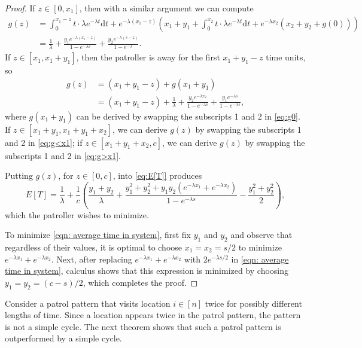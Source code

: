 \documentclass[11pt,a4paper]{article}
\begin{document}
\begin{proof}
If $z \in [0, x_1]$, then with a similar argument we can compute
\begin{align} 
g(z) &=  \int_0^{x_1-z} t \cdot \lambda e^{-\lambda t} \text{d}t + e^{-\lambda (x_1-z)} \left( x_1 + y_1 + \int_0^{x_2} t \cdot \lambda e^{-\lambda t} \text{d}t +  e^{-\lambda x_2} ( x_2 + y_2 + g(0)) \right) \nonumber \\
&= \frac{1}{\lambda} + \frac{ y_1 e^{-\lambda (x_1-z)}}{1 - e^{-\lambda s}} +  \frac{y_2 e^{-\lambda (s-z)}}{1 - e^{-\lambda}}.
\label{eq:g<x1}
\end{align}
If $z \in [x_1, x_1 + y_1]$, then the patroller is away for the first $x_1 + y_1 - z$ time units, so
\begin{align} 
g(z) &= (x_1 + y_1 -z) + g(x_1 + y_1) \nonumber \\
&= (x_1 + y_1 -z) + \frac{1}{\lambda} +  \frac{y_2 e^{-\lambda x_2}}{1 - e^{-\lambda s}} + \frac{y_1 e^{-\lambda s}}{1 - e^{-\lambda s}},
\label{eq:g>x1}
\end{align}
where $g(x_1+y_1)$ can be derived by swapping the subscripts 1 and 2 in \eqref{eq:g0}.
If $z \in [x_1 + y_1, x_1+y_1+x_2]$, we can derive $g(z)$ by swapping the subscripts 1 and 2 in \eqref{eq:g<x1}; if $z \in [x_1 + y_1 +x_2, c]$, we can derive $g(z)$ by swapping the subscripts 1 and 2 in \eqref{eq:g>x1}.

Putting $g(z)$, for $z \in [0, c]$, into \eqref{eq:E[T]} produces
\begin{equation} \label{eqn: average time in system}
E[T] = \frac{1}{\lambda} + \frac{1}{c}\left(
\frac{y_1 + y_2}{\lambda} + \frac{ 
y_1^2 + y_2^2 + y_1 y_2 (e^{-\lambda x_1} + e^{-\lambda x_2})
}{1-e^{-\lambda s}} - \frac{y_1^2 +y_2^2}{2}
\right),
\end{equation}
which the patroller wishes to minimize.

To minimize \eqref{eqn: average time in system}, first fix $y_1$ and $y_2$ and observe that regardless of their values, it is optimal to choose $x_1=x_2 = s/2$ to minimize $e^{-\lambda x_1} + e^{-\lambda x_2}$.
Next, after replacing $e^{-\lambda x_1} + e^{-\lambda x_2}$ with $2 e^{-\lambda s/2}$ in \eqref{eqn: average time in system}, calculus shows that this expression is minimized by choosing $y_1 = y_2 = (c-s)/2$, which completes the proof.
\end{proof}


Consider a patrol pattern that visits location $i \in [n]$ twice for possibly different lengths of time. 
Since a location appears twice in the patrol pattern, the pattern is not a simple cycle.
The next theorem shows that such a patrol pattern is outperformed by a  simple cycle.
\end{document}
